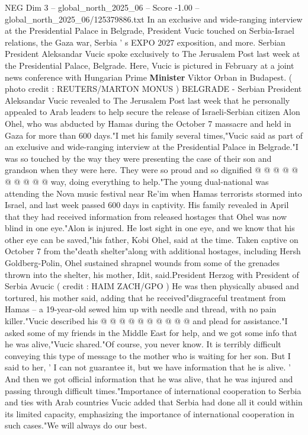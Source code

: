 \begin{textsample}{NEG Dim 3 – global\_north\_2025\_06 – Score -1.00 – global\_north\_2025\_06/125379886.txt}  \label{ex:f3_neg_351}
In an exclusive and wide-ranging interview at the Presidential Palace in Belgrade, President Vucic touched on Serbia-Israel relations, the Gaza war, Serbia ' s EXPO 2027 exposition, and more.
Serbian President Aleksandar Vucic spoke exclusively to The Jerusalem Post last week at the Presidential Palace, Belgrade.
Here, Vucic is pictured in February at a joint news conference with Hungarian Prime \textbf{Minister} Viktor Orban in Budapest. ( photo credit : REUTERS/MARTON MONUS ) BELGRADE - Serbian President Aleksandar Vucic revealed to The Jerusalem Post last week that he personally appealed to Arab leaders to help secure the release of Israeli-Serbian citizen Alon Ohel, who was abducted by Hamas during the October 7 massacre and held in Gaza for more than 600 days."I met his family several times,"Vucic said as part of an exclusive and wide-ranging interview at the Presidential Palace in Belgrade."I was so touched by the way they were presenting the case of their son and grandson when they were here.
They were so proud and so dignified @ @ @ @ @ @ @ @ @ @ way, doing everything to help."The young dual-national was attending the Nova music festival near Re'im when Hamas terrorists stormed into Israel, and last week passed 600 days in captivity.
His family revealed in April that they had received information from released hostages that Ohel was now blind in one eye."Alon is injured.
He lost sight in one eye, and we know that his other eye can be saved,"his father, Kobi Ohel, said at the time.
Taken captive on October 7 from the"death shelter"along with additional hostages, including Hersh Goldberg-Polin, Ohel sustained shrapnel wounds from some of the grenades thrown into the shelter, his mother, Idit, said.President Herzog with President of Serbia Avucic ( credit : HAIM ZACH/GPO ) He was then physically abused and tortured, his mother said, adding that he received"disgraceful treatment from Hamas -- a 19-year-old sewed him up with needle and thread, with no pain killer."Vucic described his @ @ @ @ @ @ @ @ @ @ and plead for assistance."I asked some of my friends in the Middle East for help, and we got some info that he was alive,"Vucic shared."Of course, you never know.
It is terribly difficult conveying this type of message to the mother who is waiting for her son.
But I said to her, ' I can not guarantee it, but we have information that he is alive. ' And then we got official information that he was alive, that he was injured and passing through difficult times."Importance of international cooperation to Serbia and ties with Arab countries Vucic added that Serbia had done all it could within its limited capacity, emphasizing the importance of international cooperation in such cases."We will always do our best.

\end{textsample}

